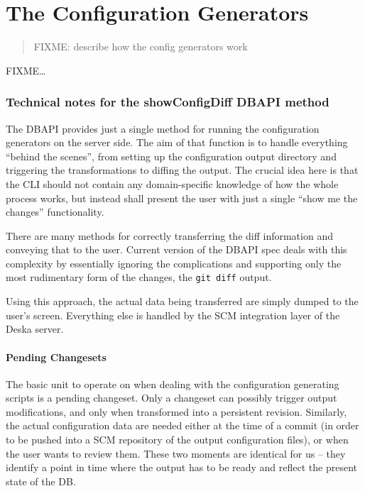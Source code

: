\documentclass[deska]{subfiles}
\begin{document}
\chapter{The Configuration Generators}
\label{sec:config-generators}

\begin{abstract}
FIXME: describe how the config generators work
\end{abstract}

FIXME\ldots

\subsection{Technical notes for the showConfigDiff DBAPI method}

The DBAPI provides just a single method for running the configuration generators on the server side.  The aim of that
function is to handle everything ``behind the scenes'', from setting up the configuration output directory and
triggering the transformations to diffing the output.  The crucial idea here is that the CLI should not contain any
domain-specific knowledge of how the whole process works, but instead shall present the user with just a single ``show
me the changes'' functionality.

There are many methods for correctly transferring the diff information and conveying that to the user.  Current version
of the DBAPI spec deals with this complexity by essentially ignoring the complications and supporting only the most
rudimentary form of the changes, the {\tt git diff} output.

Using this approach, the actual data being transferred are simply dumped to the user's screen.  Everything else is
handled by the SCM integration layer of the Deska server.

\subsubsection{Pending Changesets}

The basic unit to operate on when dealing with the configuration generating scripts is a pending changeset.  Only a
changeset can possibly trigger output modifications, and only when transformed into a persistent revision.  Similarly,
the actual configuration data are needed either at the time of a commit (in order to be pushed into a SCM repository of
the output configuration files), or when the user wants to review them.  These two moments are identical for us -- they
identify a point in time where the output has to be ready and reflect the present state of the DB.
\end{document}
